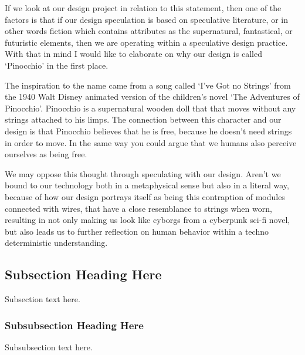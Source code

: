 \documentclass[journal]{IEEEtran}
\begin{document}
If we look at our design project in relation to this statement, then one of the factors is that if our design speculation is based on speculative literature, or in other words fiction which contains attributes as the supernatural, fantastical, or futuristic elements, then we are operating within a speculative design practice. With that in mind I would like to elaborate on why our design is called ‘Pinocchio’ in the first place.

The inspiration to the name came from a song called ‘I’ve Got no Strings’ from the 1940 Walt Disney animated version of the children’s novel ‘The Adventures of Pinocchio’. Pinocchio is a supernatural wooden doll that that moves without any strings attached to his limps. The connection between this character and our design is that Pinocchio believes that he is free, because he doesn’t need strings in order to move. In the same way you could argue that we humans also perceive ourselves as being free.

We may oppose this thought through speculating with our design. Aren’t we bound to our technology both in a metaphysical sense but also in a literal way, because of how our design portrays itself as being this contraption of modules connected with wires, that have a close resemblance to strings when worn, resulting in not only making us look like cyborgs from a cyberpunk sci-fi novel, but also leads us to further reflection on human behavior within a techno deterministic understanding.

\subsection{Subsection Heading Here}
Subsection text here.


\subsubsection{Subsubsection Heading Here}
Subsubsection text here.


%
%
\end{document}
